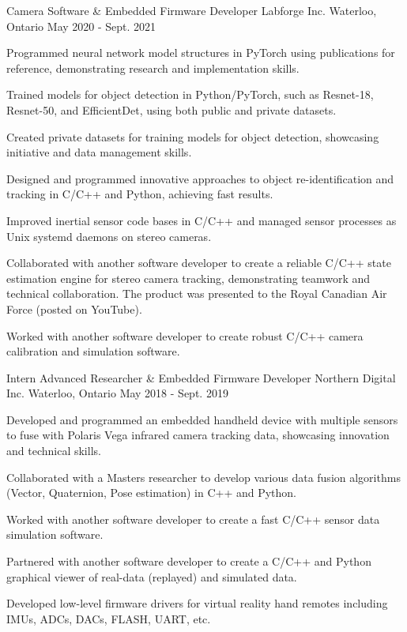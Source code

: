 \begin{cventries}
  \cventry
    {Camera Software \& Embedded Firmware Developer} %
    {Labforge Inc.} %
    {Waterloo, Ontario} %
    {May 2020 - Sept. 2021} %
    {
      \begin{cvitems} %
        \item {Programmed neural network model structures in PyTorch using publications for reference, demonstrating research and implementation skills.}
        \item {Trained models for object detection in Python/PyTorch, such as Resnet-18, Resnet-50, and EfficientDet, using both public and private datasets.}
        \item {Created private datasets for training models for object detection, showcasing initiative and data management skills.}
        \item {Designed and programmed innovative approaches to object re-identification and tracking in C/C++ and Python, achieving fast results.}
        \item {Improved inertial sensor code bases in C/C++ and managed sensor processes as Unix systemd daemons on stereo cameras.}
        \item {Collaborated with another software developer to create a reliable C/C++ state estimation engine for stereo camera tracking, demonstrating teamwork and technical collaboration. The product was presented to the Royal Canadian Air Force (posted on YouTube).}
        \item {Worked with another software developer to create robust C/C++ camera calibration and simulation software.}
      \end{cvitems}
    }

  \cventry
    {Intern Advanced Researcher \& Embedded Firmware Developer} %
    {Northern Digital Inc.} %
    {Waterloo, Ontario} %
    {May 2018 - Sept. 2019} %
    {
      \begin{cvitems} %
        \item {Developed and programmed an embedded handheld device with multiple sensors to fuse with Polaris Vega infrared camera tracking data, showcasing innovation and technical skills.}
        \item {Collaborated with a Masters researcher to develop various data fusion algorithms (Vector, Quaternion, Pose estimation) in C++ and Python.}
        \item {Worked with another software developer to create a fast C/C++ sensor data simulation software.}
        \item {Partnered with another software developer to create a C/C++ and Python graphical viewer of real-data (replayed) and simulated data.}
        \item {Developed low-level firmware drivers for virtual reality hand remotes including IMUs, ADCs, DACs, FLASH, UART, etc.}
      \end{cvitems}
    }


\end{cventries}

